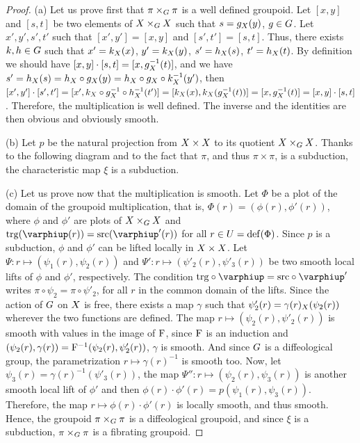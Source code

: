 \begin{proof}
  (a) Let us prove first that $\pi \times_G \pi$ is a well defined groupoid.
  Let $[x,y]$ and $[s,t]$ be two elements of $X \times_G X$ such that $s = g_X(y)$, $g \in G$.
  Let  $x',y',s',t'$ such that $[x',y'] = [x,y]$ and $[s',t'] = [s,t]$.
  Thus,
  there exists $k, h \in G$ such that $x' = k_X(x)$, $y' = k_X(y)$,
  $s' = h_X(s)$, $t' = h_X(t)$.
  By definition we should have $[x,y] \cdot [s,t] = [x, g_X^{-1}(t)]$,
  and we have $s' = h_X(s) = h_X \circ g_X(y) = h_X \circ g_X \circ k_X^{-1}(y')$,
  then $[x',y'] \cdot [s',t'] = [x', k_X \circ g_X^{-1} \circ h_X^{-1}(t')] = [k_X(x), k_X(g_X^{-1}(t))] = [x,g_X^{-1}(t)] = [x,y] \cdot [s,t]$.
  Therefore,
  the multiplication is well defined.
  The inverse and the identities are then obvious and obviously smooth.
  
  (b) Let $p$ be the natural projection from $X \times X$ to its quotient $X \times_G X$.
  Thanks to the following diagram and to the fact that $\pi$,
  and thus $\pi \times \pi$,
  is a subduction,
  the characteristic map $\xi$ is a subduction.
  \begin{center}
  \end{center}
  (c) Let us prove now that the multiplication is smooth.
  Let $\Phi$ be a plot of the domain of the groupoid multiplication,
  that is,
  $\Phi(r) = (\phi(r),\phi'(r))$,
  where $\phi$ and $\phi'$ are plots of $X \times_G X$ and $\target(\phi(r)) = \source(\phi'(r))$ for all $r \in U = \mathrm{def}(\Phi)$.
  Since $p$ is a subduction,
  $\phi$ and $\phi'$ can be lifted locally in $X \times X$.
  Let $\Psi : r \mapsto (\psi_1(r),\psi_2(r))$ and $\Psi' : r \mapsto (\psi'_2(r),\psi'_3(r))$ be two smooth local lifts of $\phi$ and $\phi'$,
  respectively.
  The condition $\target \circ \phi = \source \circ \phi'$ writes $\pi \circ \psi_2 = \pi \circ \psi'_2$,
  for all $r$ in the common domain of the lifts.
  Since the action of $G$ on $X$ is free,
  there exists a map $\gamma$ such that $\psi'_2(r) = \gamma(r)_X(\psi_2(r))$ wherever the two functions are defined.
  The map $r \mapsto (\psi_2(r),\psi'_2(r))$ is smooth with values in the image of $\mathrm{F}$,
  since $\mathrm{F}$ is an induction and $(\psi_2(r), \gamma(r)) = \mathrm{F}^{-1}(\psi_2(r),\psi'_2(r))$,
  $\gamma$ is smooth.
  And since $G$ is a diffeological group,
  the parametrization $r \mapsto \gamma(r)^{-1}$ is smooth too.
  Now,
  let $\psi_3(r) = \gamma(r)^{-1}(\psi'_3(r))$,
  the map $\Psi'' : r \mapsto (\psi_2(r),\psi_3(r))$ is another smooth local lift of $\phi'$ and then $\phi(r) \cdot \phi'(r) = p(\psi_1(r),\psi_3(r))$.
  Therefore,
  the map $r \mapsto \phi(r) \cdot \phi'(r)$ is locally smooth,
  and thus smooth.
  Hence,
  the groupoid $\pi \times_G \pi$ is a diffeological groupoid,
  and since $\xi$ is a subduction,
  $\pi \times_G \pi$ is a fibrating groupoid.
  

\end{proof}
